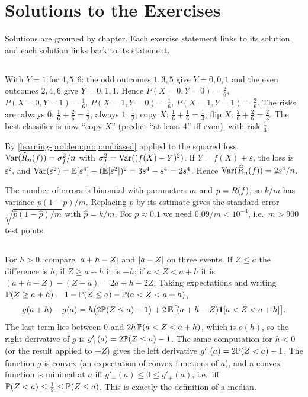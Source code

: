 \chapter{Solutions to the Exercises}\label{ch:solutions}

Solutions are grouped by chapter. Each exercise statement links to its
solution, and each solution links back to its statement.

\section{}

With $Y = 1$ for $4,5,6$: the odd outcomes $1,3,5$ give $Y = 0,0,1$ and the
even outcomes $2,4,6$ give $Y = 0,1,1$. Hence
$P(X{=}0,Y{=}0) = \frac26$, $P(X{=}0,Y{=}1) = \frac16$,
$P(X{=}1,Y{=}0) = \frac16$, $P(X{=}1,Y{=}1) = \frac26$. The risks are:
always $0$: $\frac16 + \frac26 = \frac12$; always $1$: $\frac12$; copy $X$:
$\frac16 + \frac16 = \frac13$; flip $X$: $\frac26 + \frac26 = \frac23$. The best
classifier is now ``copy $X$'' (predict ``at least 4'' iff even), with risk
$\frac13$.

By \cref{learning-problem:prop:unbiased} applied to the squared loss,
$\operatorname{Var}(\widehat{R}_n(f)) = \sigma_f^2/n$ with $\sigma_f^2 = \operatorname{Var}((f(X)-Y)^2)$. If
$Y = f(X) + \varepsilon$, the loss is $\varepsilon^2$, and
$\operatorname{Var}(\varepsilon^2) = \mathbb{E}[\varepsilon^4] - (\mathbb{E}[\varepsilon^2])^2 = 3s^4 - s^4 = 2s^4$.
Hence $\operatorname{Var}(\widehat{R}_n(f)) = 2s^4/n$.

The number of errors is binomial with parameters $m$ and $p = R(f)$, so
$k/m$ has variance $p(1-p)/m$. Replacing $p$ by its estimate gives the standard
error $\sqrt{\hat p(1-\hat p)/m}$ with $\hat p = k/m$. For $p\approx0.1$ we need
$0.09/m < 10^{-4}$, i.e.\ $m > 900$ test points.

\section{}

For $h > 0$, compare $\left|a+h-Z\right|$ and $\left|a-Z\right|$ on three events. If $Z\leq a$
the difference is $h$; if $Z\geq a+h$ it is $-h$; if $a<Z<a+h$ it is
$(a+h-Z) - (Z-a) = 2a + h - 2Z$. Taking expectations and writing
$\mathbb{P}(Z\geq a+h) = 1 - \mathbb{P}(Z\leq a) - \mathbb{P}(a<Z<a+h)$,
\[
  g(a+h) - g(a) = h\bigl(2\mathbb{P}(Z\leq a) - 1\bigr) + 2\,\mathbb{E}\bigl[(a+h-Z)\mathbf{1}[a<Z<a+h]\bigr].
\]
The last term lies between $0$ and $2h\,\mathbb{P}(a<Z<a+h)$, which is $o(h)$, so the
right derivative of $g$ is $g'_+(a) = 2\mathbb{P}(Z\leq a) - 1$. The same computation
for $h<0$ (or the result applied to $-Z$) gives the left derivative
$g'_-(a) = 2\mathbb{P}(Z<a) - 1$. The function $g$ is convex (an expectation of
convex functions of $a$), and a convex function is minimal at $a$ iff
$g'_-(a)\leq0\leq g'_+(a)$, i.e.\ iff $\mathbb{P}(Z<a)\leq\frac12\leq\mathbb{P}(Z\leq a)$.
This is exactly the definition of a median.

